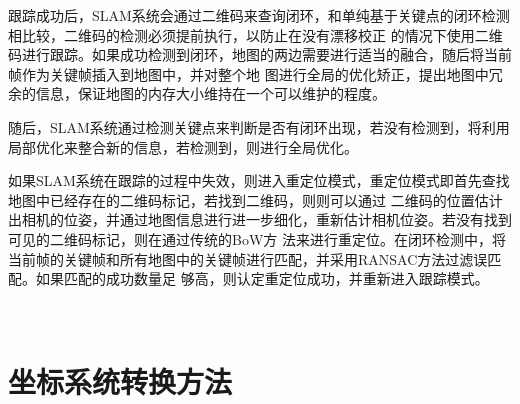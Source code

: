 跟踪成功后，SLAM系统会通过二维码来查询闭环，和单纯基于关键点的闭环检测相比较，二维码的检测必须提前执行，以防止在没有漂移校正
的情况下使用二维码进行跟踪。如果成功检测到闭环，地图的两边需要进行适当的融合，随后将当前帧作为关键帧插入到地图中，并对整个地
图进行全局的优化矫正，提出地图中冗余的信息，保证地图的内存大小维持在一个可以维护的程度。

随后，SLAM系统通过检测关键点来判断是否有闭环出现，若没有检测到，将利用局部优化来整合新的信息，若检测到，则进行全局优化。

如果SLAM系统在跟踪的过程中失效，则进入重定位模式，重定位模式即首先查找地图中已经存在的二维码标记，若找到二维码，则则可以通过
二维码的位置估计出相机的位姿，并通过地图信息进行进一步细化，重新估计相机位姿。若没有找到可见的二维码标记，则在通过传统的BoW方
法来进行重定位。在闭环检测中，将当前帧的关键帧和所有地图中的关键帧进行匹配，并采用RANSAC方法过滤误匹配。如果匹配的成功数量足
够高，则认定重定位成功，并重新进入跟踪模式。








\(\)\
\section{坐标系统转换方法}
\label{chap:chap2.4}
